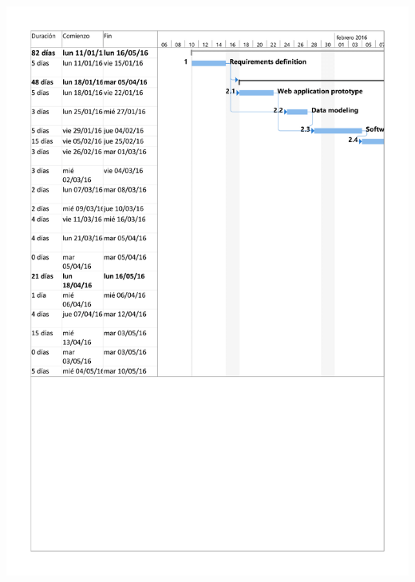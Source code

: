\documentclass{DeustoFDP}
\begin{document}
\begin{center}
	\includegraphics[width=1\linewidth]{fig/g2}
\end{center}
\end{document}
